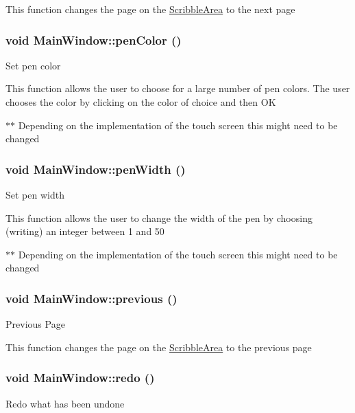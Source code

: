 This function changes the page on the \hyperlink{classScribbleArea}{ScribbleArea} to the next page \hypertarget{classMainWindow_a747d6ddec077d48a550343583d782a8f}{
\subsubsection[{penColor}]{\setlength{\rightskip}{0pt plus 5cm}void MainWindow::penColor ()}}
\label{classMainWindow_a747d6ddec077d48a550343583d782a8f}
Set pen color

This function allows the user to choose for a large number of pen colors. The user chooses the color by clicking on the color of choice and then OK

$\ast$$\ast$ Depending on the implementation of the touch screen this might need to be changed \hypertarget{classMainWindow_ad856c951088a4cb92aa4cdaae399ebfb}{
\subsubsection[{penWidth}]{\setlength{\rightskip}{0pt plus 5cm}void MainWindow::penWidth ()}}
\label{classMainWindow_ad856c951088a4cb92aa4cdaae399ebfb}
Set pen width

This function allows the user to change the width of the pen by choosing (writing) an integer between 1 and 50

$\ast$$\ast$ Depending on the implementation of the touch screen this might need to be changed \hypertarget{classMainWindow_a17ad7cbe71ea3321f5b52157a2c9a00d}{
\subsubsection[{previous}]{\setlength{\rightskip}{0pt plus 5cm}void MainWindow::previous ()}}
\label{classMainWindow_a17ad7cbe71ea3321f5b52157a2c9a00d}
Previous Page

This function changes the page on the \hyperlink{classScribbleArea}{ScribbleArea} to the previous page \hypertarget{classMainWindow_a21b622c0f1855274d69f32421f10b251}{
\subsubsection[{redo}]{\setlength{\rightskip}{0pt plus 5cm}void MainWindow::redo ()}}
\label{classMainWindow_a21b622c0f1855274d69f32421f10b251}
Redo what has been undone


